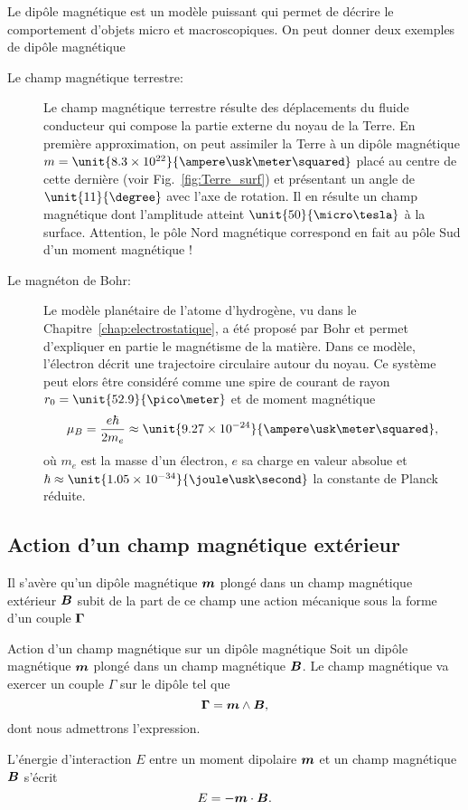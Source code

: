 	\begin{exemple}
		Le dipôle magnétique est un modèle puissant qui permet de 
		décrire le comportement d'objets micro et macroscopiques. On peut
		donner deux exemples de dipôle magnétique
		\begin{description}
			\item[Le champ magnétique terrestre: ] Le champ magnétique
			 terrestre résulte des déplacements du fluide conducteur
			 qui compose la partie externe du noyau de la Terre.
			 En première approximation, on peut assimiler la Terre 
			 à un dipôle magnétique $m = \unit{8.3 \times 10^{22}}
			 {\ampere \usk \meter \squared}$ placé au centre de cette dernière
			 (voir Fig.~\ref{fig:Terre_surf})
			 et présentant un angle de $\unit{11}{\degree}$
			 avec l'axe de rotation. Il en résulte un champ
			 magnétique dont l'amplitude atteint $\unit{50}{\micro \tesla}$
			 à la surface.
			 Attention, le pôle Nord magnétique
			 correspond en fait au pôle Sud d'un moment magnétique !
			\item[Le magnéton de Bohr: ] Le modèle planétaire de l'atome
			d'hydrogène, vu dans le Chapitre~\ref{chap:electrostatique},
			a été proposé par Bohr et permet d'expliquer en partie le magnétisme
			de la matière. Dans ce modèle, l'électron décrit une trajectoire
			circulaire autour du noyau. Ce système peut elors être considéré
			comme une spire de courant de rayon $r_0 = \unit{52.9}{\pico \meter}$
			et de moment magnétique
						\begin{equation*}
				\mu_B = \dfrac{e \hbar}{2 m_e} \approx 
				\unit{9.27 \times 10^{-24}}{\ampere \usk 
				\meter \squared},
			\end{equation*}
			où $m_e$ est la masse d'un électron, $e$ sa charge en 
			valeur absolue et $\hbar \approx 
			\unit{1.05 \times 10^{-34}}{\joule \usk \second}$ 
			la constante de Planck réduite.
		\end{description}
	\end{exemple}

\subsection{Action d'un champ magnétique extérieur}
Il s'avère qu'un dipôle magnétique $\vecm$ plongé dans un champ magnétique extérieur 
$\vecb$ subit de la part de ce champ une action mécanique sous la forme d'un couple
$\mitbf{\Gamma}$
\begin{defn}{Action d'un champ magnétique sur un dipôle magnétique}
	Soit un dipôle magnétique $\vecm$ plongé dans un champ magnétique $\vecb$.
	Le champ magnétique va exercer un couple $\Gamma$ sur le dipôle tel que
\begin{equation}
	\mitbf{\Gamma} = \vecm \wedge \vecb,
\end{equation}
dont nous admettrons l'expression. 

L'énergie d'interaction $E$ entre un moment dipolaire $\vecm$ et un champ magnétique
$\vecb$ s'écrit
\begin{equation*}
	E = - \vecm \cdot \vecb.
\end{equation*}
\end{defn}

